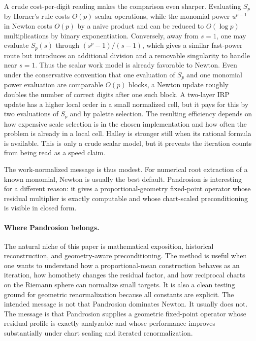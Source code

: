 \documentclass[10pt,a4paper]{article}
\theoremstyle{plain}
\theoremstyle{definition}
\theoremstyle{remark}
\begin{document}
A crude cost-per-digit reading makes the comparison even sharper.  Evaluating
$S_p$ by Horner's rule costs $O(p)$ scalar operations, while the monomial power
$u^{p-1}$ in Newton costs $O(p)$ by a naive product and can be reduced to
$O(\log p)$ multiplications by binary exponentiation.  Conversely, away from
$s=1$, one may evaluate $S_p(s)$ through $(s^p-1)/(s-1)$, which gives a similar
fast-power route but introduces an additional division and a removable
singularity to handle near $s=1$.  Thus the scalar work model is already
favorable to Newton.  Even under the conservative convention that one evaluation
of $S_p$ and one monomial power evaluation are comparable $O(p)$ blocks, a
Newton update roughly doubles the number of correct digits
after one such block.  A two-layer IRP update has a higher local order in a
small normalized cell, but it pays for this by two evaluations of $S_p$ and by
palette selection.  The resulting efficiency depends on how expensive scale
selection is in the chosen implementation and how often the problem is already
in a local cell.  Halley is stronger still when its rational formula is
available.  This is only a crude scalar model, but it prevents the iteration
counts from being read as a speed claim.

The work-normalized message is thus modest.  For numerical root extraction of a
known monomial, Newton is usually the best default.  Pandrosion is interesting
for a different reason: it gives a proportional-geometry fixed-point operator
whose residual multiplier is exactly computable and whose chart-scaled
preconditioning is visible in closed form.

\paragraph{Where Pandrosion belongs.}
The natural niche of this paper is mathematical exposition, historical
reconstruction, and geometry-aware preconditioning.  The method is useful when
one wants to understand how a proportional-mean construction behaves as an
iteration, how homothety changes the residual factor, and how reciprocal charts
on the Riemann sphere can normalize small targets.  It is also a clean testing
ground for geometric renormalization because all constants are explicit.
The intended message is not that Pandrosion dominates Newton.  It usually does
not.  The message is that Pandrosion supplies a geometric fixed-point operator
whose residual profile is exactly analyzable and whose performance improves
substantially under chart scaling and iterated renormalization.
\end{document}
